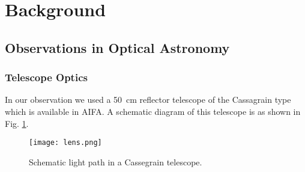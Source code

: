 \section{Background}
\subsection{Observations in Optical Astronomy}
\subsubsection{Telescope Optics}
In our observation we used a \SI{50}{\cm} reflector telescope of the Cassagrain type which is available in AIFA. 
A schematic diagram of this telescope is as shown in Fig. \ref{Fig:telescope}.
\begin{figure}[H]
	\centering
	\texttt{[image: lens.png]}
	\caption{Schematic light path in a Cassegrain telescope\cite{manual}.}%
	\label{Fig:telescope}	
\end{figure}

%

